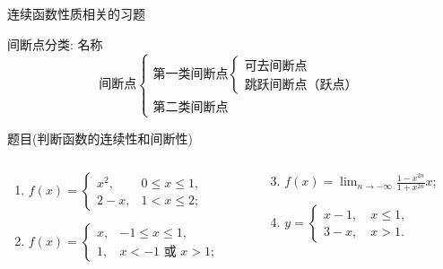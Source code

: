 \documentclass[
10pt,
aspectratio=43,
]{beamer}
\begin{document}
\begin{frame}{连续函数性质相关的习题}
	\begin{exampleblock}{间断点分类: 名称}
		\begin{equation*}
			\text{间断点}\left\{
			\begin{array}{ll}
				\text{第一类间断点}\left\{
				\begin{array}{ll}
					\text{可去间断点} \\
					\text{跳跃间断点（跃点）}
				\end{array}
				\right. \\
				\text{第二类间断点}
			\end{array}
			\right.
		\end{equation*}
	\end{exampleblock}
	\pause
	\begin{block}{题目(判断函数的连续性和间断性)}
		\begin{columns}[onlytextwidth]
			\begin{column}{0.5\textwidth}
				\begin{enumerate}
					\item $f(x)= \begin{cases}x^2, & 0 \leqslant x \leqslant 1, \\ 2-x, & 1<x \leqslant 2;\end{cases}$
					\item $f(x)= \begin{cases}x, & -1 \leqslant x \leqslant 1, \\ 1, & x<-1 \text { 或 } x>1 ;\end{cases}$
				\end{enumerate}
			\end{column}
			\begin{column}{0.5\textwidth}
				\begin{enumerate}
					\setcounter{enumi}{2}
					\item $\displaystyle f(x)=\lim _{n \rightarrow-\infty} \frac{1-x^{2 n}}{1+x^{2 n}} x$;
					\item $y=\left\{\begin{array}{l}x-1,\quad x \leqslant 1, \\ 3-x,\quad x>1.\end{array}\right.$
				\end{enumerate}
			\end{column}
		\end{columns}
	\end{block}
\end{frame}
\end{document}
